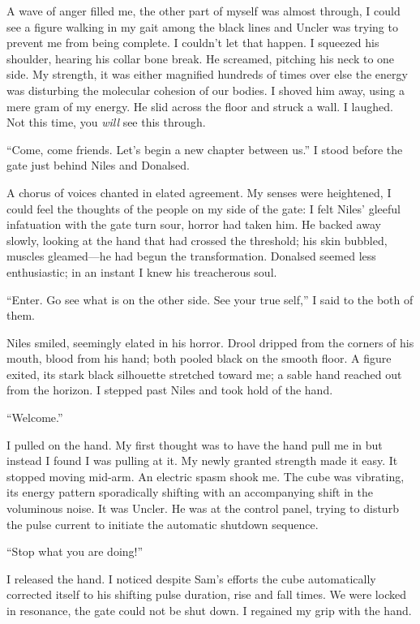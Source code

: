 \documentclass[
]{article}
\begin{document}
A wave of anger filled me, the other part of myself was almost through,
I could see a figure walking in my gait among the black lines and Uncler
was trying to prevent me from being complete. I couldn't let that
happen. I squeezed his shoulder, hearing his collar bone break. He
screamed, pitching his neck to one side. My strength, it was either
magnified hundreds of times over else the energy was disturbing the
molecular cohesion of our bodies. I shoved him away, using a mere gram
of my energy. He slid across the floor and struck a wall. I laughed. Not
this time, you \emph{will} see this through.

``Come, come friends. Let's begin a new chapter between us.'' I stood
before the gate just behind Niles and Donalsed.

A chorus of voices chanted in elated agreement. My senses were
heightened, I could feel the thoughts of the people on my side of the
gate: I felt Niles' gleeful infatuation with the gate turn sour, horror
had taken him. He backed away slowly, looking at the hand that had
crossed the threshold; his skin bubbled, muscles gleamed---he had begun
the transformation. Donalsed seemed less enthusiastic; in an instant I
knew his treacherous soul.

``Enter. Go see what is on the other side. See your true self,'' I said
to the both of them.

Niles smiled, seemingly elated in his horror. Drool dripped from the
corners of his mouth, blood from his hand; both pooled black on the
smooth floor. A figure exited, its stark black silhouette stretched
toward me; a sable hand reached out from the horizon. I stepped past
Niles and took hold of the hand.

``Welcome.''

I pulled on the hand. My first thought was to have the hand pull me in
but instead I found I was pulling at it. My newly granted strength made
it easy. It stopped moving mid-arm. An electric spasm shook me. The cube
was vibrating, its energy pattern sporadically shifting with an
accompanying shift in the voluminous noise. It was Uncler. He was at the
control panel, trying to disturb the pulse current to initiate the
automatic shutdown sequence.

``Stop what you are doing!''

I released the hand. I noticed despite Sam's efforts the cube
automatically corrected itself to his shifting pulse duration, rise and
fall times. We were locked in resonance, the gate could not be shut
down. I regained my grip with the hand.
\end{document}
